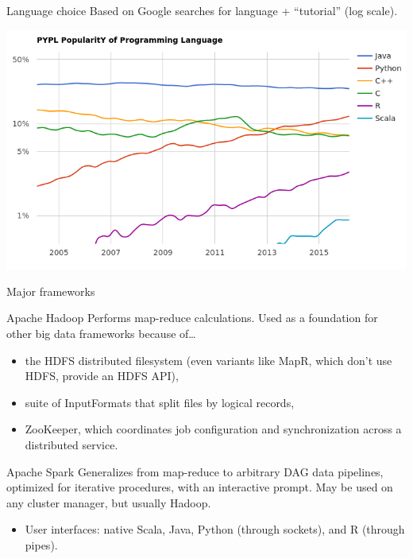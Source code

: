 \documentclass{beamer}
\begin{document}
\begin{frame}{Language choice}
Based on Google searches for language + ``tutorial'' (log scale).

\includegraphics[width=\linewidth]{language_trends.png}
\end{frame}

\begin{frame}{Major frameworks}
\begin{block}{Apache Hadoop}
Performs map-reduce calculations. Used as a foundation for other big data frameworks because of\ldots
\begin{itemize}
\item the HDFS distributed filesystem (even variants like MapR, which don't use HDFS, provide an HDFS API),
\item suite of InputFormats that split files by logical records,
\item ZooKeeper, which coordinates job configuration and synchronization across a distributed service.
\end{itemize}
\end{block}

\begin{block}{Apache Spark}
Generalizes from map-reduce to arbitrary DAG data pipelines, optimized for iterative procedures, with an interactive prompt. May be used on any cluster manager, but usually Hadoop.
\begin{itemize}
\item User interfaces: native Scala, Java, Python (through sockets), and R (through pipes).
\end{itemize}
\end{block}
\end{frame}
\end{document}

